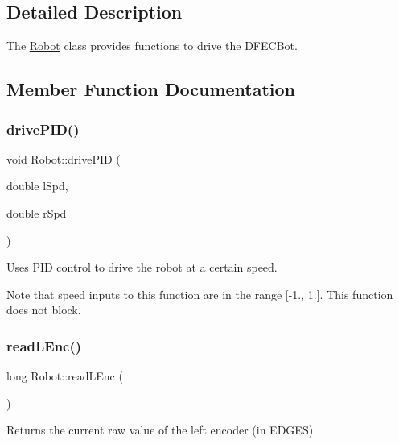 \subsection{Detailed Description}
The \hyperlink{classRobot}{Robot} class provides functions to drive the D\+F\+E\+C\+Bot. 

\subsection{Member Function Documentation}
\mbox{\label{classRobot_a88211ed70c106b8b0c1c0edec49c87a4}} 
\subsubsection{\texorpdfstring{drive\+P\+I\+D()}{drivePID()}}
{\footnotesize\ttfamily void Robot\+::drive\+P\+ID (\begin{DoxyParamCaption}\item[{double}]{l\+Spd,  }\item[{double}]{r\+Spd }\end{DoxyParamCaption})\hspace{0.3cm}{\ttfamily [inline]}}



Uses P\+ID control to drive the robot at a certain speed. 

Note that speed inputs to this function are in the range \mbox{[}-\/1., 1.\mbox{]}. This function does not block. \mbox{\label{classRobot_ab85e483abd6bb9eb1a3822b44f66aa35}} 
\subsubsection{\texorpdfstring{read\+L\+Enc()}{readLEnc()}}
{\footnotesize\ttfamily long Robot\+::read\+L\+Enc (\begin{DoxyParamCaption}{ }\end{DoxyParamCaption})\hspace{0.3cm}{\ttfamily [inline]}}

Returns the current raw value of the left encoder (in E\+D\+G\+ES) \mbox{\label{classRobot_a2bc5b4f70b378e51c9bef971d24c3465}} 
